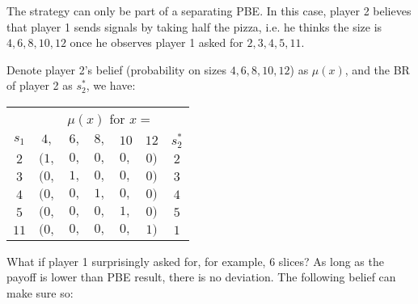 \documentclass{article}
\begin{document}
\begin{mdframed}[backgroundcolor=blue!20,linecolor=white]

The strategy can only be part of a separating PBE. In this case, player 2 believes
that player 1 sends signals by taking half the pizza, i.e. he thinks the size is $4,6,8,10,12$ once he observes player 1 asked for $2,3,4,5,11$.

\medskip 

Denote player 2's belief (probability on sizes $4, 6, 8, 10, 12$) as $\mu(x)$, and the BR of player 2 as $s_2^*$, we have:

\begin{center}
\begin{tabular}{|c|ccccc|c|}
\multicolumn{1}{c}{} & \multicolumn{6}{c}{$\mu(x)$ for $x =$}  \\
$s_1$ & $4,$ & $6,$ & $8,$ & $10$ & $12$ & $s_2^*$  \\   \cline{1-7} 
$2$ & $(1,$ & $0,$ & $0,$ & $0,$ & $0)$ & $2$ \\   
$3$ & $(0,$ & $1,$ & $0,$ & $0,$ & $0)$ & $3$ \\   
$4$ & $(0,$ & $0,$ & $1,$ & $0,$ & $0)$ & $4$ \\   
$5$ & $(0,$ & $0,$ & $0,$ & $1,$ & $0)$ & $5$ \\   
$11$& $(0,$ & $0,$ & $0,$ & $0,$ & $1)$ & $1$ \\   
\hline 
\end{tabular}
\end{center}

What if player 1 surprisingly asked for, for example, 6 slices? As long as the payoff is lower than PBE result, there is no deviation. The following belief can make sure so:


\end{mdframed}
\end{document}
